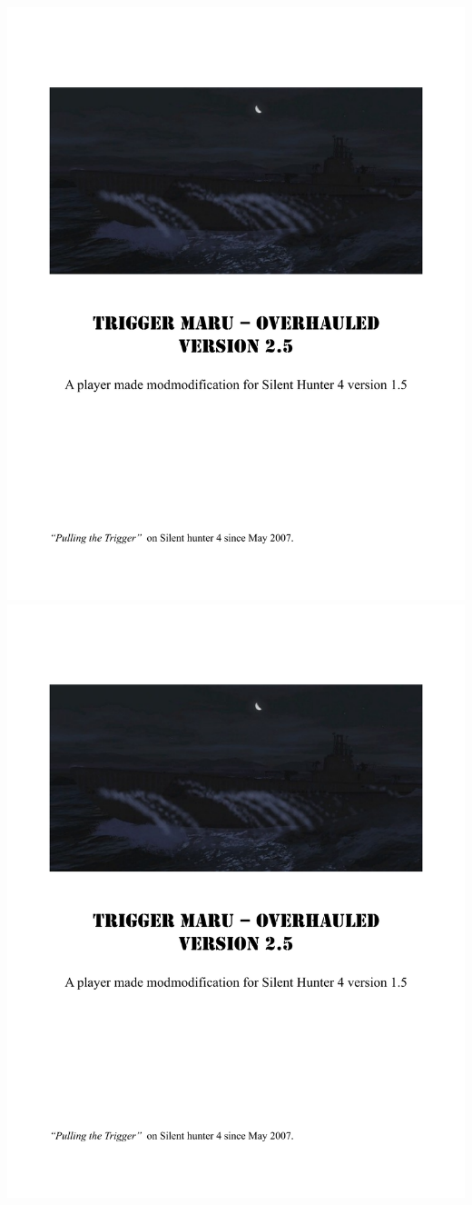 \documentclass{article}
\begin{document}
\includegraphics[page={26}, width=\textwidth, height=\textheight]{TMO_Manual}
\includegraphics[page={27}, width=\textwidth, height=\textheight]{TMO_Manual}
\end{document}
